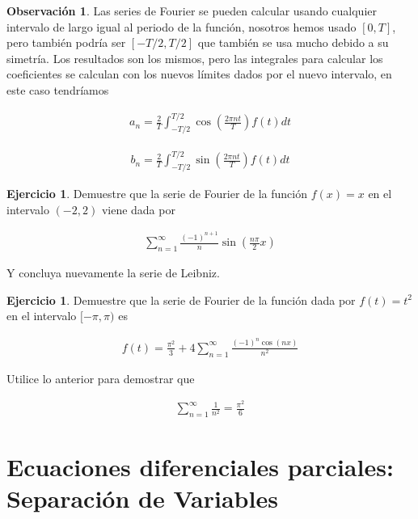 \documentclass{article}
\theoremstyle{plain}
\theoremstyle{definition}
\newtheorem{ejer}[thm]{Ejercicio}
\newtheorem{rmk}[thm]{Observación}
\begin{document}
\begin{rmk}Las series de Fourier se pueden calcular usando cualquier intervalo de largo igual al periodo de la función, nosotros hemos usado $[0,T]$, pero también podría ser $[-T/2,T/2]$ que también se usa mucho debido a su simetría. Los resultados son los mismos, pero las integrales para calcular los coeficientes se calculan con los nuevos límites dados por el nuevo intervalo, en este caso tendríamos
\end{rmk}

\begin{align*}
    a_n = \frac{2}{T} \int_{-T/2}^{T/2} \cos \left( \frac{2\pi n t}{T}\right) f(t) dt
\end{align*}

\begin{align*}
    b_n = \frac{2}{T} \int_{-T/2}^{T/2} \sin \left( \frac{2\pi n t}{T}\right) f(t) dt
\end{align*}


\begin{ejer}Demuestre que la serie de Fourier de la función $f(x)=x$ en el intervalo $(-2,2)$ viene dada por
\end{ejer}

\begin{align*}
    \sum_{n=1}^\infty \frac{(-1)^{n+1}}{n}\sin \left( \frac{n\pi}{2} x\right)
\end{align*}

Y concluya nuevamente la serie de Leibniz. \\



\begin{ejer}Demuestre que la serie de Fourier de la función dada por $f(t)=t^2$ en el intervalo $[-\pi,\pi)$ es
\end{ejer}

\begin{align*}
    f(t) = \frac{\pi^2}{3} + 4 \sum_{n=1}^\infty \frac{(-1)^n\cos(nx)}{n^2}
\end{align*}

Utilice lo anterior para demostrar que

\begin{align*}
    \sum_{n=1}^\infty \frac{1}{n^2} = \frac{\pi^2}{6}
\end{align*}

\newpage

\section{Ecuaciones diferenciales parciales: Separación de Variables}
\end{document}
